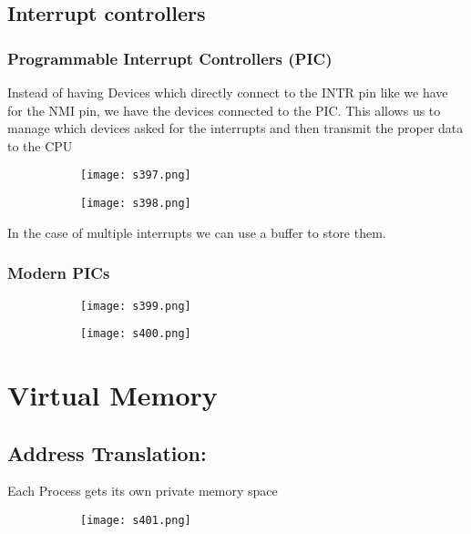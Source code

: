 \documentclass[8pt]{extreport}
\begin{document}
\section{Interrupt controllers}


\subsection{Programmable Interrupt Controllers (PIC)}

Instead of having Devices which directly connect to the INTR pin like we have for the NMI pin, we have the devices connected to the PIC. This allows us to manage which devices asked for the interrupts and then transmit the proper data to the CPU
\begin{figure}[H]
\begin{subfigure}[b]{0.4\linewidth}
\texttt{[image: s397.png]}
\end{subfigure}
\begin{subfigure}[b]{0.4\linewidth}
\texttt{[image: s398.png]}
\end{subfigure}
\end{figure}
In the case of multiple interrupts we can use a buffer to store them.

\subsection{Modern PICs}
\begin{figure}[H]
\begin{subfigure}[b]{0.4\linewidth}
\texttt{[image: s399.png]}
\end{subfigure}
\begin{subfigure}[b]{0.4\linewidth}
\texttt{[image: s400.png]}
\end{subfigure}
\end{figure}


\chapter{Virtual Memory}

\section{Address Translation:}

Each Process gets its own private memory space
\begin{figure}[H]
\begin{subfigure}[b]{0.4\linewidth}
\texttt{[image: s401.png]}
\end{subfigure}
\end{figure}
\end{document}
